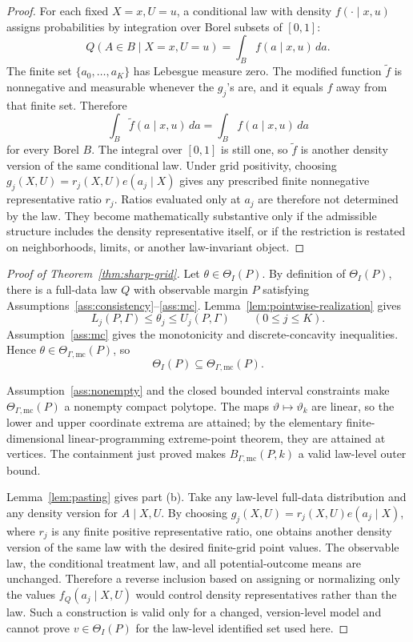 \documentclass[11pt]{article}
\theoremstyle{definition}
\theoremstyle{plain}
\theoremstyle{remark}
\begin{document}
\begin{proof}
For each fixed \(X=x,U=u\), a conditional law with density \(f(\cdot\mid x,u)\) assigns probabilities by integration over Borel subsets of \([0,1]\):
\[
  Q(A\in B\mid X=x,U=u)=\int_B f(a\mid x,u)\,da.
\]
The finite set \(\{a_0,\ldots,a_K\}\) has Lebesgue measure zero.  The modified function \(\tilde f\) is nonnegative and measurable whenever the \(g_j\)'s are, and it equals \(f\) away from that finite set.  Therefore
\[
  \int_B \tilde f(a\mid x,u)\,da=\int_B f(a\mid x,u)\,da
\]
for every Borel \(B\).  The integral over \([0,1]\) is still one, so \(\tilde f\) is another density version of the same conditional law.  Under grid positivity, choosing \(g_j(X,U)=r_j(X,U)e(a_j\mid X)\) gives any prescribed finite nonnegative representative ratio \(r_j\).  Ratios evaluated only at \(a_j\) are therefore not determined by the law.  They become mathematically substantive only if the admissible structure includes the density representative itself, or if the restriction is restated on neighborhoods, limits, or another law-invariant object.
\end{proof}

\begin{proof}[Proof of Theorem~\ref{thm:sharp-grid}]
Let \(\theta\in\Theta_I(P)\).  By definition of \(\Theta_I(P)\), there is a full-data law \(Q\) with observable margin \(P\) satisfying Assumptions~\ref{ass:consistency}--\ref{ass:mc}.  Lemma~\ref{lem:pointwise-realization} gives
\[
  L_j(P,\Gamma)\le \theta_j\le U_j(P,\Gamma)
  \qquad(0\le j\le K).
\]
Assumption~\ref{ass:mc} gives the monotonicity and discrete-concavity inequalities.  Hence \(\theta\in\Theta_{\Gamma,\mathrm{mc}}(P)\), so
\[
  \Theta_I(P)\subseteq\Theta_{\Gamma,\mathrm{mc}}(P).
\]

Assumption~\ref{ass:nonempty} and the closed bounded interval constraints make \(\Theta_{\Gamma,\mathrm{mc}}(P)\) a nonempty compact polytope.  The maps \(\vartheta\mapsto\vartheta_k\) are linear, so the lower and upper coordinate extrema are attained; by the elementary finite-dimensional linear-programming extreme-point theorem, they are attained at vertices.  The containment just proved makes \(B_{\Gamma,\mathrm{mc}}(P,k)\) a valid law-level outer bound.

Lemma~\ref{lem:pasting} gives part (b).  Take any law-level full-data distribution and any density version for \(A\mid X,U\).  By choosing \(g_j(X,U)=r_j(X,U)e(a_j\mid X)\), where \(r_j\) is any finite positive representative ratio, one obtains another density version of the same law with the desired finite-grid point values.  The observable law, the conditional treatment law, and all potential-outcome means are unchanged.  Therefore a reverse inclusion based on assigning or normalizing only the values \(f_Q(a_j\mid X,U)\) would control density representatives rather than the law.  Such a construction is valid only for a changed, version-level model and cannot prove \(v\in\Theta_I(P)\) for the law-level identified set used here.
\end{proof}
\end{document}
